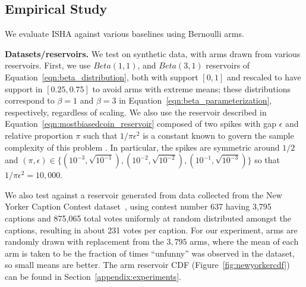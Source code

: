 
\subsection {Empirical Study}\label{experiments}
We evaluate ISHA against various baselines
using Bernoulli arms.


\textbf{Datasets/reservoirs.}
We test on synthetic data, with arms drawn from various reservoirs.
First, we use $Beta(1,1)$, and $Beta(3,1)$ reservoirs of Equation~\ref{eqn:beta_distribution},
both with support $[0,1]$ and rescaled to have support in $[0.25,0.75]$
to avoid arms with extreme means; these distributions correspond to $\beta=1$ and $\beta=3$ in Equation~\ref{eqn:beta_parameterization}, respectively, regardless of scaling. 
We also use the reservoir described in Equation~\ref{eqn:mostbiasedcoin_reservoir} composed of two spikes with gap $\epsilon$ and relative proportion $\pi$ such that $1/{\pi \epsilon^2}$ is a constant known to govern the sample complexity of this problem \citep{chandrasekaran2014finding,malloy2012quickest,jamieson2016power}.
In particular, the spikes are symmetric around $1/2$ and $(\pi,\epsilon) \in \{(10^{-3},\sqrt{10^{-1}}), (10^{-2},\sqrt{10^{-2}}), (10^{-1},\sqrt{10^{-3}})\}$ so that $1/{\pi \epsilon^2}=10,000$.

We also test against a reservoir generated from data collected from the New Yorker Caption Contest dataset~\citep{NIPS2015_5868},
using contest number 637 having 3,795 captions and 875,065 total votes uniformly at random distributed amongst the captions, resulting in about 231 votes per caption. For our experiment, arms are randomly drawn with replacement from the $3,795$ arms, where the mean of each arm is taken to be the fraction of times ``unfunny'' was observed in the dataset, so small means are better. The arm reservoir CDF (Figure~\ref{fig:newyorkercdf}) can be found in Section~\ref{appendix:experiments}.


